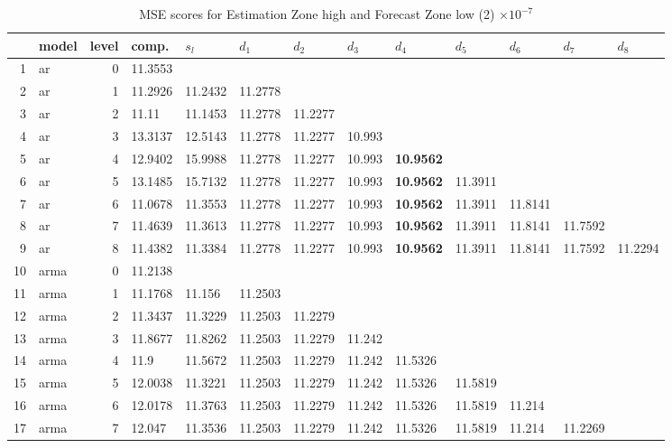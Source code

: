 \documentclass[10pt,a4paper]{article}
\begin{document}
\begin{table}[ht]
\centering
\caption{MSE scores for Estimation Zone high and Forecast Zone low (2) $ \times 10^{-7}$} 
\begin{tabular}{rlrllllllllll}
  \hline
 & model & level & comp. & $s_l$ & $d_1$ & $d_2$ & $d_3$ & $d_4$ & $d_5$ & $d_6$ & $d_7$ & $d_8$ \\ 
  \hline
1 & ar &     0 & 11.3553 &  &  &  &  &  &  &  &  &  \\ 
  2 & ar &     1 & 11.2926 & 11.2432 & 11.2778 &  &  &  &  &  &  &  \\ 
  3 & ar &     2 & 11.11 & 11.1453 & 11.2778 & 11.2277 &  &  &  &  &  &  \\ 
  4 & ar &     3 & 13.3137 & 12.5143 & 11.2778 & 11.2277 & 10.993 &  &  &  &  &  \\ 
  5 & ar &     4 & 12.9402 & 15.9988 & 11.2778 & 11.2277 & 10.993 & \textbf{10.9562} &  &  &  &  \\ 
  6 & ar &     5 & 13.1485 & 15.7132 & 11.2778 & 11.2277 & 10.993 & \textbf{10.9562} & 11.3911 &  &  &  \\ 
  7 & ar &     6 & 11.0678 & 11.3553 & 11.2778 & 11.2277 & 10.993 & \textbf{10.9562} & 11.3911 & 11.8141 &  &  \\ 
  8 & ar &     7 & 11.4639 & 11.3613 & 11.2778 & 11.2277 & 10.993 & \textbf{10.9562} & 11.3911 & 11.8141 & 11.7592 &  \\ 
  9 & ar &     8 & 11.4382 & 11.3384 & 11.2778 & 11.2277 & 10.993 & \textbf{10.9562} & 11.3911 & 11.8141 & 11.7592 & 11.2294 \\ 
   \hline
10 & arma &     0 & 11.2138 &  &  &  &  &  &  &  &  &  \\ 
  11 & arma &     1 & 11.1768 & 11.156 & 11.2503 &  &  &  &  &  &  &  \\ 
  12 & arma &     2 & 11.3437 & 11.3229 & 11.2503 & 11.2279 &  &  &  &  &  &  \\ 
  13 & arma &     3 & 11.8677 & 11.8262 & 11.2503 & 11.2279 & 11.242 &  &  &  &  &  \\ 
  14 & arma &     4 & 11.9 & 11.5672 & 11.2503 & 11.2279 & 11.242 & 11.5326 &  &  &  &  \\ 
  15 & arma &     5 & 12.0038 & 11.3221 & 11.2503 & 11.2279 & 11.242 & 11.5326 & 11.5819 &  &  &  \\ 
  16 & arma &     6 & 12.0178 & 11.3763 & 11.2503 & 11.2279 & 11.242 & 11.5326 & 11.5819 & 11.214 &  &  \\ 
  17 & arma &     7 & 12.047 & 11.3536 & 11.2503 & 11.2279 & 11.242 & 11.5326 & 11.5819 & 11.214 & 11.2269 &  \\ 

\end{tabular}
\end{table}
\end{document}
